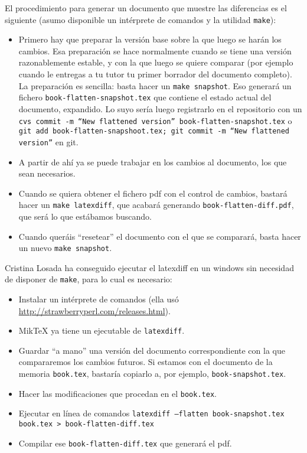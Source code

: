 El procedimiento para generar un documento que muestre las diferencias es el siguiente (asumo disponible un intérprete de comandos y la utilidad \texttt{make}):

\begin{itemize}
  \item Primero hay que preparar la versión base sobre la que luego se harán los cambios. Esa preparación se hace normalmente cuando se tiene una versión razonablemente estable, y con la que luego se quiere comparar (por ejemplo cuando le entregas a tu tutor tu primer borrador del documento completo). La preparación es sencilla: basta hacer un \texttt{make snapshot}. Eso generará un fichero \texttt{book-flatten-snapshot.tex} que contiene el estado actual del documento, expandido. Lo suyo sería luego registrarlo en el repositorio con un \texttt{cvs commit -m ``New flattened version'' book-flatten-snapshot.tex} o \texttt{git add book-flatten-snapshoot.tex; git commit -m ``New flattened version''} en git.
  \item A partir de ahí ya se puede trabajar en los cambios al documento, los que sean necesarios.
  \item Cuando se quiera obtener el fichero pdf con el control de cambios, bastará hacer un \texttt{make latexdiff}, que acabará generando \texttt{book-flatten-diff.pdf}, que será lo que estábamos buscando.
  
  \item Cuando queráis ``resetear'' el documento con el que se comparará, basta hacer un nuevo \texttt{make snapshot}.
\end{itemize}

Cristina Losada ha conseguido ejecutar el latexdiff en un windows sin necesidad de disponer de \texttt{make}, para lo cual es necesario:

\begin{itemize}
  \item Instalar un intérprete de comandos (ella usó \url{http://strawberryperl.com/releases.html}).
  
  \item MikTeX ya tiene un ejecutable de \texttt{latexdiff}.
  
  \item Guardar ``a mano'' una versión del documento correspondiente con la que compararemos los cambios futuros. Si estamos con el documento de la memoria \texttt{book.tex}, bastaría copiarlo a, por ejemplo, \texttt{book-snapshot.tex}.
  
  \item Hacer las modificaciones que procedan en el \texttt{book.tex}.
  
  \item Ejecutar en línea de comandos \texttt{latexdiff --flatten book-snapshot.tex book.tex > book-flatten-diff.tex}
  
  \item Compilar ese \texttt{book-flatten-diff.tex} que generará el pdf.
  
\end{itemize}

